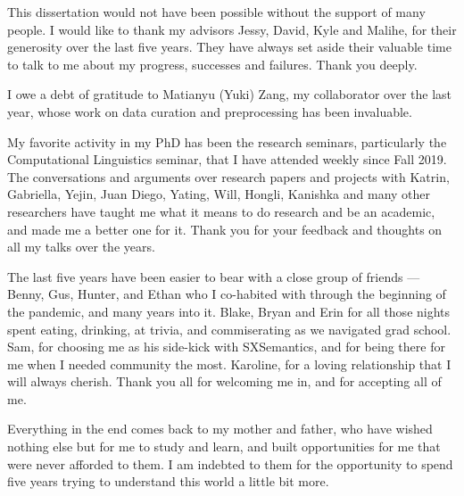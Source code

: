 \begin{acknowledgments}		%
    This dissertation would not have been possible without the support of many people. I would like to thank my advisors Jessy, David, Kyle and Malihe, for their generosity over the last five years. They have always set aside their valuable time to talk to me about my progress, successes and failures. Thank you deeply.
    
    I owe a debt of gratitude to Matianyu (Yuki) Zang, my collaborator over the last year, whose work on data curation and preprocessing has been invaluable. 
    
    My favorite activity in my PhD has been the research seminars, particularly the Computational Linguistics seminar, that I have attended weekly since Fall 2019. The conversations and arguments over research papers and projects with Katrin, Gabriella, Yejin, Juan Diego, Yating, Will, Hongli, Kanishka and many other researchers have taught me what it means to do research and be an academic, and made me a better one for it. Thank you for your feedback and thoughts on all my talks over the years.
    
    The last five years have been easier to bear with a close group of friends --- Benny, Gus, Hunter, and Ethan who I co-habited with through the beginning of the pandemic, and many years into it. Blake, Bryan and Erin for all those nights spent eating, drinking, at trivia, and commiserating as we navigated grad school. Sam, for choosing me as his side-kick with SXSemantics, and for being there for me when I needed community the most. Karoline, for a loving relationship that I will always cherish. Thank you all for welcoming me in, and for accepting all of me.
    
    Everything in the end comes back to my mother and father, who have wished nothing else but for me to study and learn, and built opportunities for me that were never afforded to them. I am indebted to them for the opportunity to spend five years trying to understand this world a little bit more.
\end{acknowledgments}

%
\utabstract

